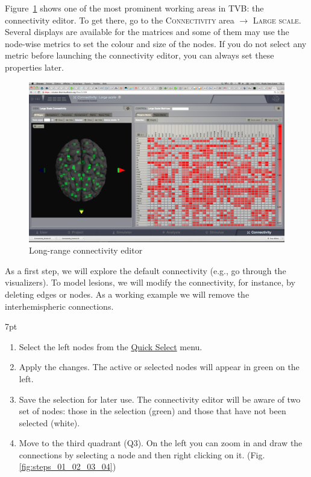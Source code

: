 \documentclass{tufte-handout}
\newenvironment{formal}{%
  \def\FrameCommand{%
    \hspace{1pt}%
    {\color{DarkBlue}\vrule width 2pt}%
    {\color{formalshade}\vrule width 4pt}%
    \colorbox{formalshade}%
  }%
  \MakeFramed{\advance\hsize-\width\FrameRestore}%
  \noindent\hspace{-4.55pt}%
  \begin{adjustwidth}{}{7pt}%
  \vspace{2pt}\vspace{2pt}%
}
{%
  \vspace{2pt}\end{adjustwidth}\endMakeFramed%
}
\begin{document}
Figure~\ref{fig:fig} shows one of the most prominent working areas in
\textsc{TVB}: the connectivity editor. To get there, go to the
\textsc{Connectivity} area $\rightarrow$ \textsc{Large scale}. Several
displays are available for the matrices and some of them may use the node-wise
metrics to set the colour and size of the nodes. If you do not select any
metric before launching the connectivity editor, you can always set these
properties later.

\begin{figure}[h]
  \includegraphics[width=\linewidth]{Handout_UI_ModellingStructuralLesions_ConnectivityArea}%
  \caption{Long-range connectivity editor}%
  \label{fig:fig}%
\end{figure}

\noindent As a first step, we will explore the default connectivity (e.g., go through
the visualizers). To model lesions, we will modify the connectivity, for
instance, by deleting edges or nodes. As a working example we will remove the
interhemispheric connections. 


\begin{formal}
  \begin{enumerate}
  \item Select the left nodes from the \underline{Quick Select} menu. 
  \item Apply the changes. The active or selected nodes will appear in green on the left. 
  \item Save the selection for later use. The connectivity editor will be aware of two set of nodes: those in the selection (green) and those that have not been selected (white). 
  \item Move to the third quadrant (Q3). On the left you can zoom in and draw the connections by selecting a node and then right clicking on it. (Fig. \ref{fig:steps_01_02_03_04})
\end{enumerate}
\end{formal}
\end{document}
